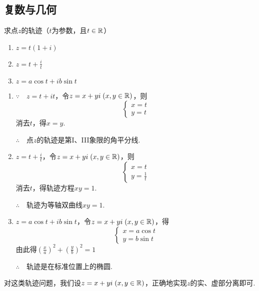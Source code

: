 \subsection{复数与几何}

\begin{example}
求点$z$的轨迹（$t$为参数，且$t\in\mathbb{R}$）
\begin{multicols}{3}
\begin{enumerate}[(1)]
    \item $z=t(1+i)$
    \item $z=t+\frac{i}{t}$
    \item $z=a\cos t+ib\sin t$
\end{enumerate}
\end{multicols}
\end{example}

\begin{solution}
\begin{enumerate}[(1)]
    \item $\because\quad z=t+it$，令$z=x+yi\; (x,y\in\mathbb{R})$，则
\[\begin{cases}
    x=t\\y=t
\end{cases}\]
消去$t$，得$x=y$.

$\therefore\quad $点$z$的轨迹是第I、III象限的角平分线.

\item $z=t+\frac{i}{t}$，令$z=x+yi\; (x,y\in\mathbb{R})$，则
\[\begin{cases}
    x=t\\[1.5ex] y=\frac{1}{t}
\end{cases}\]
消去$t$，得轨迹方程$xy=1$.

$\therefore\quad $轨迹为等轴双曲线$xy=1$.

\item $z=a\cos t+ib\sin t$，令$z=x+yi\; (x,y\in\mathbb{R})$，得
\[\begin{cases}
x=a\cos t\\y=b\sin t
\end{cases}\]
由此得$\left(\frac{x}{a}\right)^2+\left(\frac{y}{b}\right)^2=1$

$\therefore\quad $轨迹是在标准位置上的椭圆.
\end{enumerate}
\end{solution}    

\begin{rmk}
对这类轨迹问题，我们设$z=x+yi\; (x,y\in\mathbb{R})$，正确地实现$z$的实、虚部分离即可.
\end{rmk}


